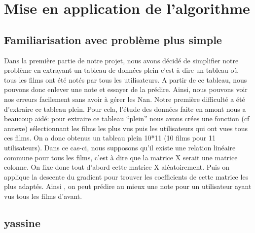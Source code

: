 \documentclass[a4paper,10pt]{article}
\begin{document}
\section{Mise en application de l'algorithme}
\subsection{Familiarisation avec problème plus simple}
Dans la première partie de notre projet, nous avons décidé de simplifier notre problème en extrayant un tableau de données 
plein c'est à dire un tableau où tous les films ont été notés par tous les utilisateurs. 
A partir de ce tableau, nous pouvons donc enlever une note et essayer de la prédire. Ainsi, nous pouvons voir nos erreurs facilement sans avoir à gérer les Nan.
Notre première difficulté a été d'extraire ce tableau plein. Pour cela, l'étude des données faite en amont nous a beaucoup aidé: pour extraire ce tableau ``plein''
nous avons crées une fonction (cf annexe) sélectionnant les films les plus vus puis les utilisateurs qui ont vues tous ces films. On a donc obtenus un
tableau plein 10*11 (10 films pour 11 utilisateurs).
Dans ce cas-ci, nous supposons qu'il existe une relation linéaire commune pour tous les films, c'est à dire que la matrice X serait une matrice colonne.
On fixe donc tout d'abord cette matrice X aléatoirement. Puis on applique la descente du gradient pour trouver les coefficients de cette matrice les plus adaptés.
Ainsi , on peut prédire au mieux une note pour un utilisateur ayant vus tous les films d'avant.
\subsection{yassine}
\end{document}
